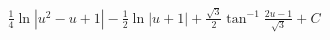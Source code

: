 \documentclass[preview]{standalone}
\begin{document}
\begin{align*}
\frac{1}{4}\ln|u^2-u+1|-\frac{1}{2}\ln|u+1|+\frac{\sqrt3}{2}\tan^{-1}\frac{2u-1}{\sqrt3}+C
\end{align*}
\end{document}
